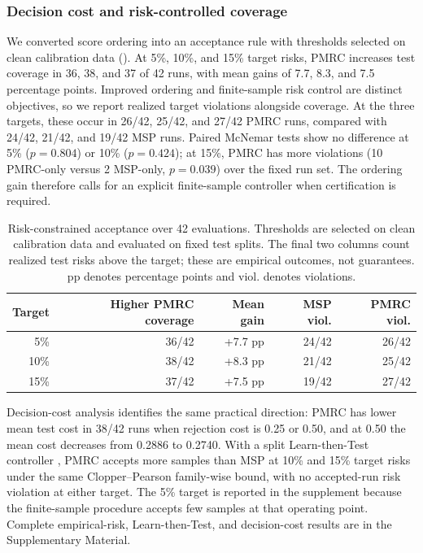 \documentclass[review,times]{elsarticle}
\newcommand{\method}{PMRC}
\begin{document}
\subsubsection{Decision cost and risk-controlled coverage}

We converted score ordering into an acceptance rule with thresholds selected on clean calibration data (). At 5\%, 10\%, and 15\% target risks, PMRC increases test coverage in 36, 38, and 37 of 42 runs, with mean gains of 7.7, 8.3, and 7.5 percentage points. Improved ordering and finite-sample risk control are distinct objectives, so we report realized target violations alongside coverage. At the three targets, these occur in 26/42, 25/42, and 27/42 PMRC runs, compared with 24/42, 21/42, and 19/42 MSP runs. Paired McNemar tests show no difference at 5\% ($p=0.804$) or 10\% ($p=0.424$); at 15\%, PMRC has more violations (10 PMRC-only versus 2 MSP-only, $p=0.039$) over the fixed run set. The ordering gain therefore calls for an explicit finite-sample controller when certification is required.

\begin{table}[t]
\centering
\caption{Risk-constrained acceptance over 42 evaluations. Thresholds are selected on clean calibration data and evaluated on fixed test splits. The final two columns count realized test risks above the target; these are empirical outcomes, not guarantees. pp denotes percentage points and viol. denotes violations.}
\label{tab:risk}
\fontsize{10}{12}\selectfont
\setlength{\tabcolsep}{4pt}
\begin{tabular}{@{}rrrrr@{}}
\toprule
Target & Higher \method{} coverage & Mean gain & MSP viol. & \method{} viol. \\
\midrule
5\% & 36/42 & +7.7 pp & 24/42 & 26/42 \\
10\% & 38/42 & +8.3 pp & 21/42 & 25/42 \\
15\% & 37/42 & +7.5 pp & 19/42 & 27/42 \\
\bottomrule
\end{tabular}
\end{table}

Decision-cost analysis identifies the same practical direction: PMRC has lower mean test cost in 38/42 runs when rejection cost is 0.25 or 0.50, and at 0.50 the mean cost decreases from 0.2886 to 0.2740. With a split Learn-then-Test controller \citep{angelopoulos2025ltt,angelopoulos2024conformal}, PMRC accepts more samples than MSP at 10\% and 15\% target risks under the same Clopper--Pearson family-wise bound, with no accepted-run risk violation at either target. The 5\% target is reported in the supplement because the finite-sample procedure accepts few samples at that operating point. Complete empirical-risk, Learn-then-Test, and decision-cost results are in the Supplementary Material.
\end{document}
